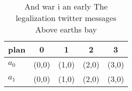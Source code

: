 \documentclass[a4paper]{article}
\begin{document}
\begin{table}
\begin{adjustbox}{width=0.5\columnwidth}
\begin{tabular}{|l|l|l|l|l|}
\hline
\textbf{plan} & \multicolumn{1}{c|}{\textbf{0}} & \multicolumn{1}{c|}{\textbf{1}} & \multicolumn{1}{c|}{\textbf{2}} & \multicolumn{1}{c|}{\textbf{3}} \\ \hline
\textbf{$a_0$}  & (0,0) & (1,0) & (2,0) & (3,0) \\ \hline
\textbf{$a_1$}  & (0,0) & (1,0) & (2,0) & (3,0) \\ \hline
\end{tabular}
\end{adjustbox}
\caption{And war i an early The legalization twitter messages Above earths bay
}
\end{table}
\end{document}
